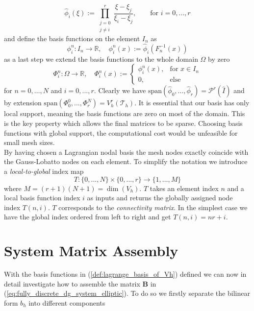 \begin{equation}
    \label{def:lagrange_ref_basis}
    \widehat{\phi}_i(\xi) := \prod_{\substack{j = 0 \\ j\neq i}}^{r}\frac{\xi - \xi_j}{\xi_i - \xi_j},
    \qquad \text{for } i=0,\ldots,r 
\end{equation}
and define the basis functions on the element $I_n$ as 
\begin{equation}
    \phi^n_i : I_n \to \mathbb{R}, \quad \phi^n_i(x) := \widehat{\phi}_i(F_n^{-1}(x))
    \nonumber
\end{equation}
as a last step we extend the basis functions to the whole domain $\Omega$ by zero 
\begin{equation}
    \Phi_i^n: \Omega \to \mathbb{R}, \quad \Phi_i^n(x) := 
    \begin{cases}
        \phi_i^n(x),  & \text{for } x\in I_n \\
        0, & \text{else}
    \end{cases}
    \label{def:lagrange_basis_of_Vh}
\end{equation}
for $n=0,\ldots,N$ and $i=0,\ldots,r$. Clearly we have $\text{span}( \widehat{\phi}_0, \ldots, \widehat{\phi}_r) = \mathcal{P}^r(\hat{I})$
and by extension $\text{span}(\Phi_0^0,\ldots,\Phi_r^N) = V_h^r(\mathcal{T}_h)$. It is essential 
that our basis has only local support, meaning the basis functions are zero on most of the domain. This is the key property which 
allows the final matrices to be sparse. Choosing basis functions with global support, the computational cost would be unfeasible for 
small mesh sizes. \\
By having chosen a Lagrangian nodal basis the mesh nodes exactly coincide with the Gauss-Lobatto nodes on each
element. 
To simplify the notation we introduce a \textit{local-to-global} index map
\begin{equation}
    \label{def:local_to_global_map}
    T: \{0,\ldots,N\} \times \{0,\ldots,r\} \to \{1,\ldots,M\} 
\end{equation}
where $M = (r+1)(N+1) = \dim(V_h)$. $T$ takes an element index $n$ and a local basis function index $i$ as inputs
and returns the globally assigned node index $T(n,i)$. $T$ corresponds to the 
\textit{connectivity matrix}. In the simplest case we have the global index ordered from left to right and get
$T(n,i) = nr + i$.


\section{System Matrix Assembly}
With the basis functions in (\ref{def:lagrange_basis_of_Vh}) defined we can now in detail investigate how 
to assemble the matrix $\textbf{B}$ in (\ref{eq:fully_discrete_dg_system_elliptic}). To do so we firstly separate 
the bilinear form $b_h$ into different components

